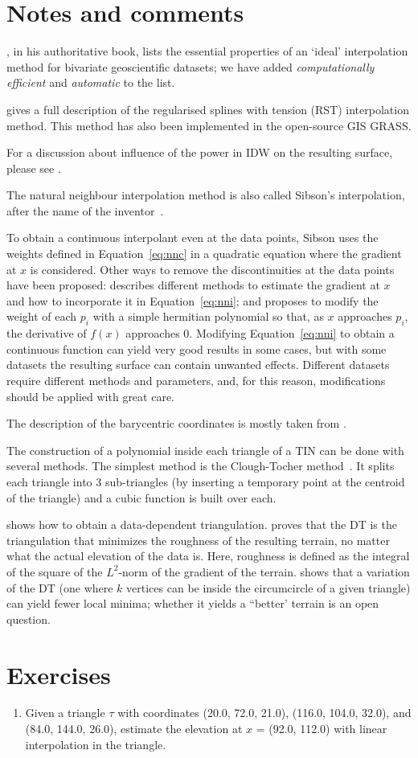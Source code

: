 %
\section{Notes and comments}


\citet{Watson92}, in his authoritative book, lists the essential properties of an `ideal' interpolation method for bivariate geoscientific datasets; we have added \emph{computationally efficient} and \emph{automatic} to the list.

\citet{Mitasova93} gives a full description of the regularised splines with tension (RST) interpolation method.
This method has also been implemented in the open-source GIS GRASS\@.

For a discussion about influence of the power in IDW on the resulting surface, please see \citet{Watson92}.

The natural neighbour interpolation method is also called Sibson's interpolation, after the name of the inventor~\citep{Sibson81}. 

To obtain a continuous interpolant even at the data points, Sibson uses the weights defined in Equation~\ref{eq:nnc} in a quadratic equation where the gradient at $x$ is considered. 
Other ways to remove the discontinuities at the data points have been proposed: \citet{Watson92} describes different methods to estimate the gradient at $x$ and how to incorporate it in Equation~\ref{eq:nni}; and \citet{Gold89} proposes to modify the weight of each $p_{i}$ with a simple hermitian polynomial so that, as $x$ approaches $p_{i}$, the derivative of $f(x)$ approaches 0. 
Modifying Equation~\ref{eq:nni} to obtain a continuous function can yield very good results in some cases, but with some datasets the resulting surface can contain unwanted effects.
Different datasets require different methods and parameters, and, for this reason, modifications should be applied with great care. 

The description of the barycentric coordinates is mostly taken from \citet{Eberly18}.

The construction of a polynomial inside each triangle of a TIN can be done with several methods. 
The simplest method is the Clough-Tocher method~\citep{Clough65,Farin85}.
It splits each triangle into 3 sub-triangles (by inserting a temporary point at the centroid of the triangle) and a cubic function is built over each.

\citet{Dyn90} shows how to obtain a data-dependent triangulation.
\citet{Rippa90} proves that the DT is the triangulation that minimizes the roughness of the resulting terrain, no matter what the actual elevation of the data is. 
Here, roughness is defined as the integral of the square of the $L^2$-norm of the gradient of the terrain.
\citet{Gudmundsson02} shows that a variation of the DT (one where $k$ vertices can be inside the circumcircle of a given triangle) can yield fewer local minima; whether it yields a ``better' terrain is an open question.


%
\section{Exercises}

\begin{enumerate}
  \item Given a triangle $\tau$ with coordinates (20.0, 72.0, 21.0), (116.0, 104.0, 32.0), and (84.0, 144.0, 26.0), estimate the elevation at $x$ = (92.0, 112.0) with linear interpolation in the triangle.
\end{enumerate}

